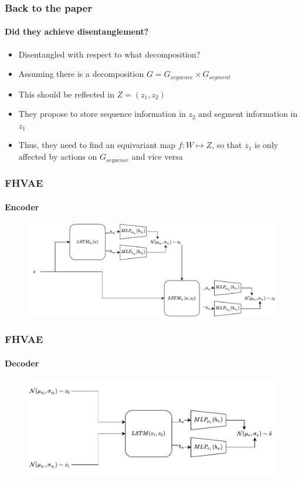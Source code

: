 \documentclass[9pt]{beamer}
\begin{document}
\begin{frame}
\frametitle{Back to the paper}
\framesubtitle{Did they achieve disentanglement?}
\begin{itemize}
	\item Disentangled with respect to what decomposition?
	\item Assuming there is a decomposition $G = G_{sequence} \times G_{segment}$
	\item This should be reflected in $Z= (z_1, z_2)$
	\item They propose to store sequence information in $z_2$ and segment information in $z_1$
	\item Thus, they need to find an equivariant map $f:W\mapsto Z$, so that $z_1$ is only affected by actions on $G_{sequence}$ and vice versa
\end{itemize}
\end{frame} 



\begin{frame}
\frametitle{FHVAE}
\framesubtitle{Encoder}
\begin{figure}
	\includegraphics[width=1\linewidth]{figures/fhvae_encoder.pdf}
\end{figure}
\end{frame} 

\begin{frame}
\frametitle{FHVAE}
\framesubtitle{Decoder}
\begin{figure}
	\includegraphics[width=.8\linewidth]{figures/fhvae_decoder.pdf}
\end{figure}
\end{frame} 
\end{document}
